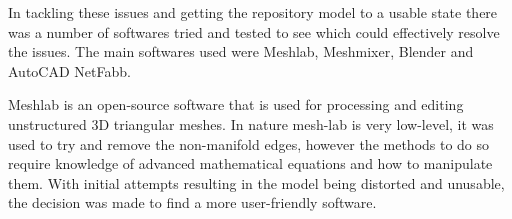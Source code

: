 In tackling these issues and getting the repository model to a usable state there was a number of softwares tried and tested to see which could effectively resolve the issues. The main softwares used were Meshlab, Meshmixer, Blender and AutoCAD NetFabb.

Meshlab is an open-source software that is used for processing and editing unstructured 3D triangular meshes. In nature mesh-lab is very low-level,  it was used to try and remove the non-manifold edges, however the methods to do so require knowledge of advanced mathematical equations and how to manipulate them. With initial attempts resulting in the model being distorted and unusable, the decision was made to find a more user-friendly software.



